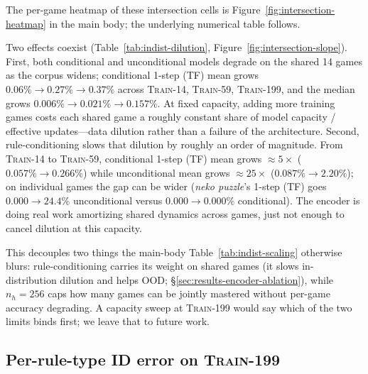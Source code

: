 The per-game heatmap of these intersection cells is
Figure~\ref{fig:intersection-heatmap} in the main body; the
underlying numerical table follows.

\begin{table}[t]
  \centering
  \caption{\textbf{Per-game 1-step (teacher-forced) cell-error (\%) on
    the 14 games shared by every training corpus.} Mean across each
    game's authored levels; lower is better. The bottom two rows are
    mean and median across the 14 intersection games. Columns are
    grouped by training preset (ascending corpus size) with the
    conditional and unconditional model paired at each scale.}
  \label{tab:indist-dilution}
  \small
  
\end{table}

Two effects coexist (Table~\ref{tab:indist-dilution},
Figure~\ref{fig:intersection-slope}). First, both
conditional and unconditional models degrade on the shared 14 games as
the corpus widens; conditional 1-step (TF) mean grows
$0.06\% \to 0.27\% \to 0.37\%$ across \textsc{Train-14},
\textsc{Train-59}, \textsc{Train-199}, and the median grows
$0.006\% \to 0.021\% \to 0.157\%$. At fixed capacity, adding more
training games costs each shared game a roughly constant share of
model capacity / effective updates---data dilution rather than a
failure of the architecture. Second, rule-conditioning slows that
dilution by roughly an order of magnitude. From \textsc{Train-14} to
\textsc{Train-59}, conditional 1-step (TF) mean grows $\approx 5\times$
($0.057\% \to 0.266\%$) while unconditional mean grows $\approx 25\times$
($0.087\% \to 2.20\%$); on individual games the gap can be wider
(\textit{neko puzzle}'s 1-step (TF) goes $0.000 \to 24.4\%$ unconditional
versus $0.000 \to 0.000\%$ conditional). The encoder is doing real
work amortizing shared dynamics across games, just not enough to
cancel dilution at this capacity.

This decouples two things the main-body Table~\ref{tab:indist-scaling}
otherwise blurs: rule-conditioning carries its weight on shared
games (it slows in-distribution dilution and helps OOD;
\S\ref{sec:results-encoder-ablation}), while $n_h{=}256$ caps how
many games can be jointly mastered without per-game accuracy
degrading. A capacity sweep at \textsc{Train-199} would say which
of the two limits binds first; we leave that to future work.

\subsection{Per-rule-type ID error on \textsc{Train-199}}
\label{app:rule-type}

